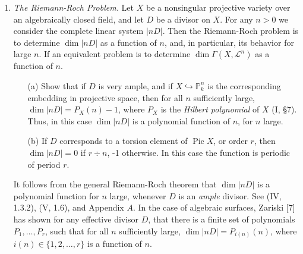 \documentclass{article}
\newcommand{\fO}{\mathcal{O}}
\newcommand{\fL}{\mathcal{L}}
\newcommand{\fM}{\mathcal{M}}
\newcommand{\PP}{\mathbb{P}}
\DeclareMathOperator{\pic}{Pic}
\begin{document}
\begin{enumerate} [label=\textbf{\arabic*.}, leftmargin=-0em]
\begin{proof}
\begin{itemize}
\item[(d)] Let $i : X \to \PP_A^n$ be an immersion such that $\fL \cong i^*\fO_{\PP_A^n}(1)$, and let $\varphi : X \to \PP_A^m$ be the unique $A$-morphism corresponding to $\fM$ (7.1). By the universal property of the fiber project $\PP_A^n \times_A \PP_A^m$, there exists a unique $A$-morphism $\phi : X \to \PP_A^n \times_A \PP_A^m$ such that $i = p_n \circ \phi$ and $\varphi = p_m \circ \phi$, where $p_n : \PP_A^n \times_A \PP_A^m \to \PP_A^n$ and $p_m : \PP_A^n \times_A \PP_A^m \to \PP_A^m$ are the natural projection maps. It is not hard to see $\phi$ is an immersion, and composing it with a Segre embedding (Ex. 5.12), we obtain an immersion $\phi' : X \to \PP_A^N$, where $N = nm + n + m$, such that $\fL \otimes \fM \cong \phi'^* \fO(1)$.

\item[(e)] If $\fL$ is ample, then there exists $n_0 > 0$ such that $\fL^{n - 1}$ is generated by global sections for all $n \geq n_0$. By (d), $\fL^n = \fL \otimes \fL^{n - 1}$ is very ample for all $n \geq n_0$.
\end{itemize} 
\end{proof}


\item \textit{The Riemann-Roch Problem.} Let $X$ be a nonsingular projective variety over an algebraically closed field, and let $D$ be a divisor on $X$. For any $n > 0$ we consider the complete linear system $|nD|$. Then the Riemann-Roch problem is to determine $\dim{|nD|}$ as a function of $n$, and, in particular, its behavior for large $n$. If an equivalent problem is to determine $\dim{\Gamma(X, \fL^n)}$ as a function of $n$.
\begin{itemize}
    \item[(a)] Show that if $D$ is very ample, and if $X \hookrightarrow \PP^n_k$ is the corresponding embedding in projective space, then for all $n$ sufficiently large, $\dim{|nD|} = P_X(n) - 1$, where $P_X$ is the \textit{Hilbert polynomial} of $X$ (I, \S 7). Thus, in this case $\dim{|nD|}$ is a polynomial function of $n$, for $n$ large.
    \item[(b)] If $D$ corresponds to a torsion element of $\pic{X}$, or order $r$, then $\dim{|nD|} = 0$ if $r \div n$, -1 otherwise. In this case the function is periodic of period $r$.
\end{itemize}

It follows from the general Riemann-Roch theorem that $\dim{|nD|}$ is a polynomial function for $n$ large, whenever $D$ is an \textit{ample} divisor. See (IV, 1.3.2), (V, 1.6), and Appendix $A$. In the case of algebraic surfaces, Zariski [7] has shown for any effective divisor $D$, that there is a finite set of polynomials $P_1, \dots, P_r$, such that for all $n$ sufficiently large, $\dim{|nD|} = P_{i(n)}(n)$, where $i(n) \in \{1, 2, \dots, r \}$ is a function of $n$.


\end{enumerate}
\end{document}
